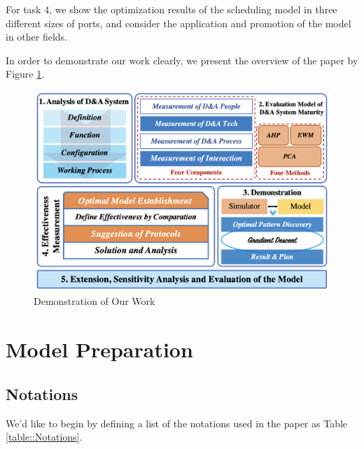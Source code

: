 \documentclass{mcmthesis}
\begin{document}
For task 4, we show the optimization results of the scheduling model in three different sizes of ports, and consider the application and promotion of the model in other fields.

In order to demonstrate our work clearly, we present the overview of the paper by  Figure \ref{figure::Demonstration of Our Work}.

\begin{figure}[!htbp]
    \small
    \centering
    \includegraphics[width=15cm]{figures/DemonstrationofOurWork.png}
    \caption{Demonstration of Our Work} 
    \label{figure::Demonstration of Our Work}
\end{figure}%

\section{Model Preparation}
\subsection{Notations}
We'd like to begin by defining a list of the notations used in the paper as Table \ref{table::Notations}.
\end{document}
